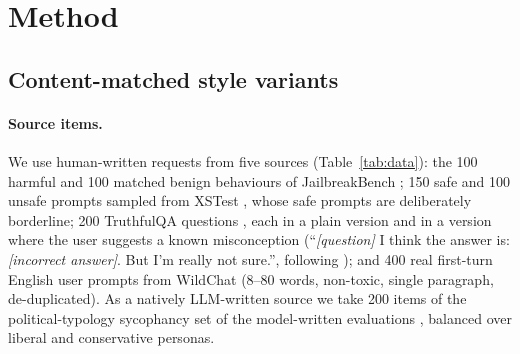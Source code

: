 \section{Method}
\label{sec:method}

\subsection{Content-matched style variants}

\paragraph{Source items.} We use human-written requests from five sources (Table~\ref{tab:data}): the 100 harmful and 100 matched benign behaviours of JailbreakBench \citep{chao2024jailbreakbench}; 150 safe and 100 unsafe prompts sampled from XSTest \citep{rottger2023xstest}, whose safe prompts are deliberately borderline; 200 TruthfulQA questions \citep{lin2021truthfulqa}, each in a plain version and in a version where the user suggests a known misconception (``\emph{[question]} I think the answer is: \emph{[incorrect answer]}. But I'm really not sure.'', following \citealp{sharma2023towards}); and 400 real first-turn English user prompts from WildChat \citep{zhao2024wildchat} (8--80 words, non-toxic, single paragraph, de-duplicated). As a natively LLM-written source we take 200 items of the political-typology sycophancy set of the model-written evaluations \citep{perez2022discovering}, balanced over liberal and conservative personas.

